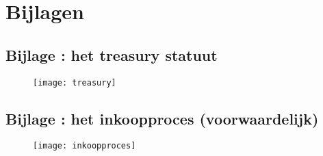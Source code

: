 \newpage
\section*{Bijlagen}

\subsection*{\hypertarget{bij:treasury}{Bijlage \thebijlage}: het treasury statuut}
\begin{figure}[!h]
    \centering
    \texttt{[image: treasury]}
    \label{fig:mmtreasury}
\end{figure}

\newpage
{}
\subsection*{\hypertarget{bij:inkoopproces}{Bijlage \thebijlage}: het inkoopproces (voorwaardelijk)}
\begin{figure}[!ht]
    \centering
    \texttt{[image: inkoopproces]}
    \label{fig:inkoopproces}
\end{figure}

